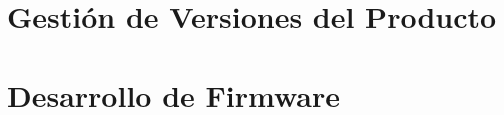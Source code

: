 \documentclass[
    language=spanish,
    school=esdf,
    docstage=final,
    media=paper,
    bookprint=false,
    linkcolor=red!45!black,
    chapterstyle=classic,
    coverstyle=classic,
    aiacknowledgement=true,
    listprefix=false
]{IPLeiriaThesis}
\begin{document}










\part{Gestión de Versiones del Producto}




\part{Desarrollo de Firmware}








\renewcommand{\refname}{Bibliography}
\printbibliography[title={\refname},heading=bibintoc]

\appendix









\end{document}
